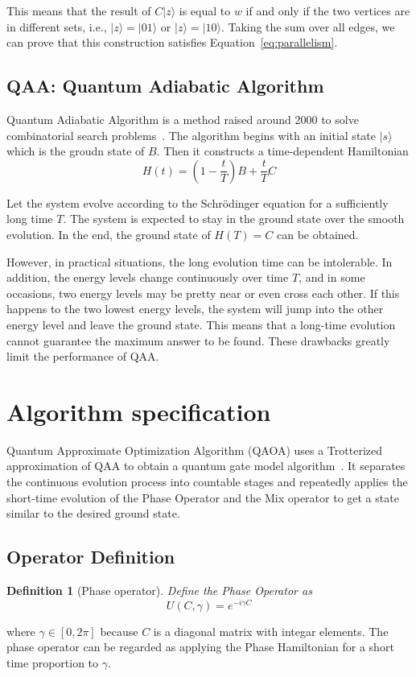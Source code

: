 \documentclass{./source/Report}
\newtheorem{definition}{Definition}
\begin{document}
This means that the result of $C\vert z\rangle$ is equal to $w$ if and only if the two vertices 
are in different sets, i.e., $\vert z \rangle = \vert 01\rangle$ or $\vert z \rangle =\vert 10\rangle$. Taking the sum over all 
edges, we can prove that this construction satisfies Equation~\ref{eq:parallelism}.

\subsection{QAA: Quantum Adiabatic Algorithm}

Quantum Adiabatic Algorithm is a method raised around 2000 to solve combinatorial search problems~\cite{farhi2000quantum}. The algorithm 
begins with an initial state $|s\rangle$ which is the groudn state of $B$. Then it constructs a time-dependent Hamiltonian
\begin{equation}
    H(t)=(1-\frac{t}{T})B+\frac{t}{T}C 
\end{equation} 

Let the system evolve according to the Schrödinger equation for a sufficiently long time $T$. The system is expected to 
stay in the ground state over the smooth evolution. In the end, the ground state of $H(T) = C$ can be obtained.

However, in practical situations, the long evolution time can be intolerable. 
In addition, the energy levels change continuously over time $T$, and in some occasions, two 
energy levels may be pretty near or even cross each other. If this happens to the two lowest energy levels, 
the system will jump into the other energy level and leave the ground state. This means that a long-time evolution cannot guarantee
the maximum answer to be found. These drawbacks greatly limit the performance of QAA.

\section{Algorithm specification}

Quantum Approximate Optimization Algorithm (QAOA) uses 
a Trotterized approximation of QAA to obtain a quantum gate model algorithm~\cite{farhi2014quantum}.
It separates the continuous evolution process into countable stages and repeatedly applies the short-time evolution of the Phase Operator and the Mix operator to get a state similar to the desired ground state.

\subsection{Operator Definition}
\begin{definition}[Phase operator]
Define the Phase Operator as 
\begin{equation}
    U(C, \gamma)=e^{-i\gamma C}
\end{equation} 
\end{definition}
where $\gamma\in [0, 2\pi]$ because $C$ is a diagonal matrix with integar elements. 
The phase operator can be regarded as applying the Phase Hamiltonian for a short time proportion
to $\gamma$.
\end{document}
